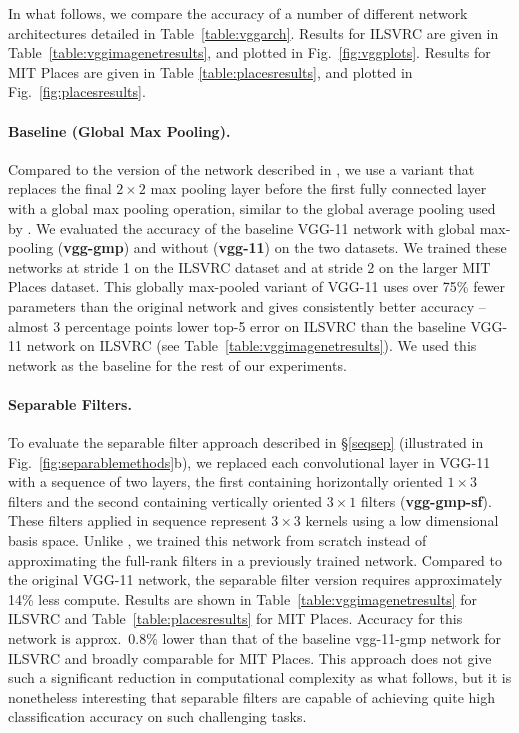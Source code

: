\documentclass[thesis]{subfiles}
\begin{document}
    
    
    In what follows, we compare the accuracy of a number of different network architectures detailed in  Table~\ref{table:vggarch}. Results for ILSVRC are given in Table~\ref{table:vggimagenetresults}, and plotted in Fig.~\ref{fig:vggplots}. Results for MIT Places are given in Table \ref{table:placesresults}, and plotted in Fig.~\ref{fig:placesresults}. 
    
    \paragraph{Baseline (Global Max Pooling).}  Compared to the version of the network described in \citep{Simonyan2014verydeep}, we use a variant that replaces the final $2 \times 2$ max pooling layer before the first fully connected layer with a global max pooling operation, similar to the global average pooling used by \citet{Lin2014,Szegedy2014going}. We evaluated the accuracy of the baseline VGG-11 network with global max-pooling (\textbf{vgg-gmp}) and without (\textbf{vgg-11}) on the two datasets. We trained these networks at stride 1 on the ILSVRC dataset and at stride 2 on the larger MIT Places dataset. This globally max-pooled variant of VGG-11 uses over 75\% fewer parameters than the original network and gives consistently better accuracy -- almost 3 percentage points lower top-5 error on ILSVRC than the baseline VGG-11 network on ILSVRC (see Table~\ref{table:vggimagenetresults}). We used this network as the baseline for the rest of our experiments.
    
    
    \paragraph{Separable Filters.} To evaluate the separable filter approach described in \S \ref{seqsep} (illustrated in Fig.~\ref{fig:separablemethods}b), we replaced each convolutional layer in VGG-11 with a sequence of two layers, the first containing horizontally oriented $1 \times 3$ filters and the second containing vertically oriented $3 \times 1$ filters (\textbf{vgg-gmp-sf}). These filters applied in sequence represent $3 \times 3$ kernels using a low dimensional basis space. Unlike \citet{journals/corr/JaderbergVZ14}, we trained this network from scratch instead of approximating the full-rank filters in a previously trained network. Compared to the original VGG-11 network, the separable filter version requires approximately 14\% less compute. Results are shown in Table~\ref{table:vggimagenetresults} for ILSVRC and Table~\ref{table:placesresults} for MIT Places. Accuracy for this network is approx.~0.8\% lower than that of the baseline vgg-11-gmp network for ILSVRC and broadly comparable for MIT Places. This approach does not give such a significant reduction in computational complexity as what follows, but it is nonetheless interesting that separable  filters are capable of achieving quite high classification accuracy on such challenging tasks.
    
\end{document}
